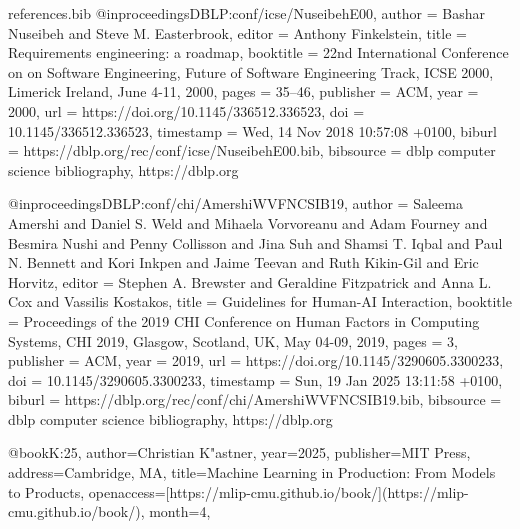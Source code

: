 \begin{filecontents*}{references.bib}
    @inproceedings{DBLP:conf/icse/NuseibehE00,
      author       = {Bashar Nuseibeh and
                      Steve M. Easterbrook},
      editor       = {Anthony Finkelstein},
      title        = {Requirements engineering: a roadmap},
      booktitle    = {22nd International Conference on on Software Engineering, Future of
                      Software Engineering Track, {ICSE} 2000, Limerick Ireland, June 4-11,
                      2000},
      pages        = {35--46},
      publisher    = {{ACM}},
      year         = {2000},
      url          = {https://doi.org/10.1145/336512.336523},
      doi          = {10.1145/336512.336523},
      timestamp    = {Wed, 14 Nov 2018 10:57:08 +0100},
      biburl       = {https://dblp.org/rec/conf/icse/NuseibehE00.bib},
      bibsource    = {dblp computer science bibliography, https://dblp.org}
    }
    
    @inproceedings{DBLP:conf/chi/AmershiWVFNCSIB19,
      author       = {Saleema Amershi and
                      Daniel S. Weld and
                      Mihaela Vorvoreanu and
                      Adam Fourney and
                      Besmira Nushi and
                      Penny Collisson and
                      Jina Suh and
                      Shamsi T. Iqbal and
                      Paul N. Bennett and
                      Kori Inkpen and
                      Jaime Teevan and
                      Ruth Kikin{-}Gil and
                      Eric Horvitz},
      editor       = {Stephen A. Brewster and
                      Geraldine Fitzpatrick and
                      Anna L. Cox and
                      Vassilis Kostakos},
      title        = {Guidelines for Human-AI Interaction},
      booktitle    = {Proceedings of the 2019 {CHI} Conference on Human Factors in Computing
                      Systems, {CHI} 2019, Glasgow, Scotland, UK, May 04-09, 2019},
      pages        = {3},
      publisher    = {{ACM}},
      year         = {2019},
      url          = {https://doi.org/10.1145/3290605.3300233},
      doi          = {10.1145/3290605.3300233},
      timestamp    = {Sun, 19 Jan 2025 13:11:58 +0100},
      biburl       = {https://dblp.org/rec/conf/chi/AmershiWVFNCSIB19.bib},
      bibsource    = {dblp computer science bibliography, https://dblp.org}
    }
    
    @book{K:25,
    author={Christian K{"a}stner},
    year={2025},
    publisher={MIT Press},
    address={Cambridge, MA},
    title={Machine Learning in Production: From Models to Products},
    openaccess={[https://mlip-cmu.github.io/book/}](https://mlip-cmu.github.io/book/),
    month={4},
    }
    

\end{filecontents*}
